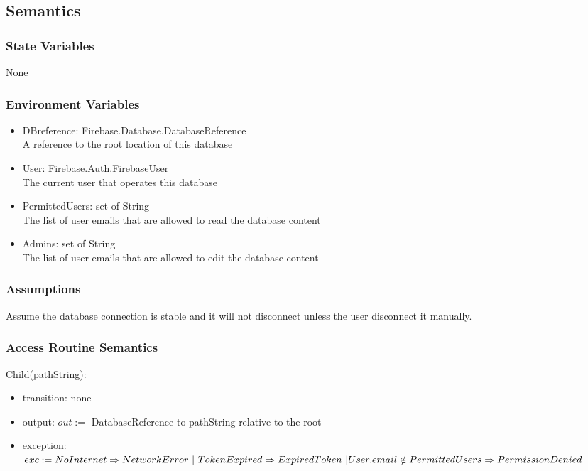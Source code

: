 \documentclass[12pt, titlepage]{article}
\begin{document}
\begin{itemize}
\subsection{Semantics}

\subsubsection{State Variables}

None

\subsubsection{Environment Variables}

\begin{itemize}
\item DBreference: Firebase.Database.DatabaseReference\\
A reference to the root location of this database
\item User: Firebase.Auth.FirebaseUser\\
The current user that operates this database
\item PermittedUsers: set of String\\
The list of user emails that are allowed to read the database content
\item Admins: set of String\\
The list of user emails that are allowed to edit the database content
\end{itemize}


\subsubsection{Assumptions}

Assume the database connection is stable and it will not disconnect unless the user disconnect it manually.

\subsubsection{Access Routine Semantics}

\noindent Child(pathString):
\begin{itemize}
\item transition: none 
\item output: $out :=$ DatabaseReference to pathString relative to the root
\item exception: $exc := NoInternet \Rightarrow NetworkError\ | \ TokenExpired \Rightarrow ExpiredToken\ | \\ User.email \notin PermittedUsers \Rightarrow PermissionDenied$
\end{itemize}


\end{itemize}
\end{document}
